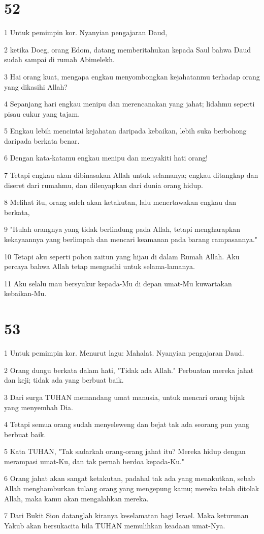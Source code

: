 \chapter{52}

\par 1 Untuk pemimpin kor. Nyanyian pengajaran Daud,
\par 2 ketika Doeg, orang Edom, datang memberitahukan kepada Saul bahwa Daud sudah sampai di rumah Abimelekh.
\par 3 Hai orang kuat, mengapa engkau menyombongkan kejahatanmu terhadap orang yang dikasihi Allah?
\par 4 Sepanjang hari engkau menipu dan merencanakan yang jahat; lidahmu seperti pisau cukur yang tajam.
\par 5 Engkau lebih mencintai kejahatan daripada kebaikan, lebih suka berbohong daripada berkata benar.
\par 6 Dengan kata-katamu engkau menipu dan menyakiti hati orang!
\par 7 Tetapi engkau akan dibinasakan Allah untuk selamanya; engkau ditangkap dan diseret dari rumahmu, dan dilenyapkan dari dunia orang hidup.
\par 8 Melihat itu, orang saleh akan ketakutan, lalu menertawakan engkau dan berkata,
\par 9 "Itulah orangnya yang tidak berlindung pada Allah, tetapi mengharapkan kekayaannya yang berlimpah dan mencari keamanan pada barang rampasannya."
\par 10 Tetapi aku seperti pohon zaitun yang hijau di dalam Rumah Allah. Aku percaya bahwa Allah tetap mengasihi untuk selama-lamanya.
\par 11 Aku selalu mau bersyukur kepada-Mu di depan umat-Mu kuwartakan kebaikan-Mu.

\chapter{53}

\par 1 Untuk pemimpin kor. Menurut lagu: Mahalat. Nyanyian pengajaran Daud.
\par 2 Orang dungu berkata dalam hati, "Tidak ada Allah." Perbuatan mereka jahat dan keji; tidak ada yang berbuat baik.
\par 3 Dari surga TUHAN memandang umat manusia, untuk mencari orang bijak yang menyembah Dia.
\par 4 Tetapi semua orang sudah menyeleweng dan bejat tak ada seorang pun yang berbuat baik.
\par 5 Kata TUHAN, "Tak sadarkah orang-orang jahat itu? Mereka hidup dengan merampasi umat-Ku, dan tak pernah berdoa kepada-Ku."
\par 6 Orang jahat akan sangat ketakutan, padahal tak ada yang menakutkan, sebab Allah menghamburkan tulang orang yang mengepung kamu; mereka telah ditolak Allah, maka kamu akan mengalahkan mereka.
\par 7 Dari Bukit Sion datanglah kiranya keselamatan bagi Israel. Maka keturunan Yakub akan bersukacita bila TUHAN memulihkan keadaan umat-Nya.

